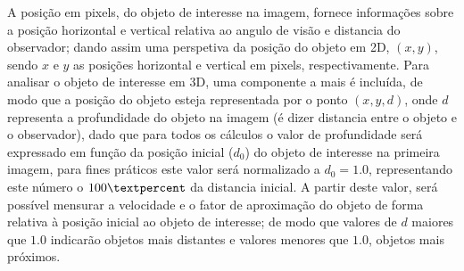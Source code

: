 A posição em pixels, do objeto de interesse na imagem, fornece informações 
sobre a posição horizontal e vertical relativa ao angulo de visão e 
distancia do observador; dando assim uma perspetiva 
da posição do objeto em 2D, $(x, y)$, sendo $x$ e $y$ as posições 
horizontal e vertical em pixels, respectivamente. Para analisar o objeto de interesse em 
3D, uma componente a mais é incluída, de modo que a posição do objeto esteja representada
por o ponto $(x, y, d)$, onde $d$ representa a profundidade 
do objeto na imagem (é dizer distancia entre o objeto e o observador), 
dado que para todos os cálculos o valor de profundidade
será expressado em função da posição inicial ($d_0$) do objeto de interesse na primeira imagem,
para fines práticos este valor será normalizado a $d_0=1.0$, representando este número
o $100\textpercent$ da distancia inicial. A partir
deste valor, será possível mensurar a velocidade e o fator de aproximação do objeto
de forma relativa à posição inicial ao objeto de interesse; de modo que valores de $d$
maiores que $1.0$ indicarão objetos mais distantes e valores menores que $1.0$, objetos mais próximos.

